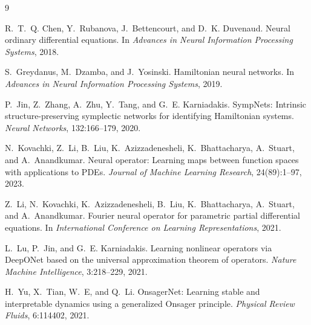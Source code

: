 \documentclass[11pt]{article}
\begin{document}
\begin{thebibliography}{9}

R.~T.~Q. Chen, Y.~Rubanova, J.~Bettencourt, and D.~K. Duvenaud.
Neural ordinary differential equations.
In \emph{Advances in Neural Information Processing Systems}, 2018.

S.~Greydanus, M.~Dzamba, and J.~Yosinski.
Hamiltonian neural networks.
In \emph{Advances in Neural Information Processing Systems}, 2019.

P.~Jin, Z.~Zhang, A.~Zhu, Y.~Tang, and G.~E. Karniadakis.
SympNets: Intrinsic structure-preserving symplectic networks for identifying Hamiltonian systems.
\emph{Neural Networks}, 132:166--179, 2020.

N.~Kovachki, Z.~Li, B.~Liu, K.~Azizzadenesheli, K.~Bhattacharya, A.~Stuart, and A.~Anandkumar.
Neural operator: Learning maps between function spaces with applications to PDEs.
\emph{Journal of Machine Learning Research}, 24(89):1--97, 2023.

Z.~Li, N.~Kovachki, K.~Azizzadenesheli, B.~Liu, K.~Bhattacharya, A.~Stuart, and A.~Anandkumar.
Fourier neural operator for parametric partial differential equations.
In \emph{International Conference on Learning Representations}, 2021.

L.~Lu, P.~Jin, and G.~E. Karniadakis.
Learning nonlinear operators via DeepONet based on the universal approximation theorem of operators.
\emph{Nature Machine Intelligence}, 3:218--229, 2021.

H.~Yu, X.~Tian, W.~E, and Q.~Li.
OnsagerNet: Learning stable and interpretable dynamics using a generalized Onsager principle.
\emph{Physical Review Fluids}, 6:114402, 2021.

\end{thebibliography}
\end{document}

